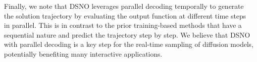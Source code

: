 Finally, we note that DSNO leverages parallel decoding temporally to generate the solution trajectory by evaluating the output function at different time steps in parallel. This is in contrast to the prior training-based methods that have a sequential nature and predict the trajectory step by step.  %
We believe that DSNO with parallel decoding is a key step for the real-time sampling of diffusion models, potentially benefiting many interactive applications. 

